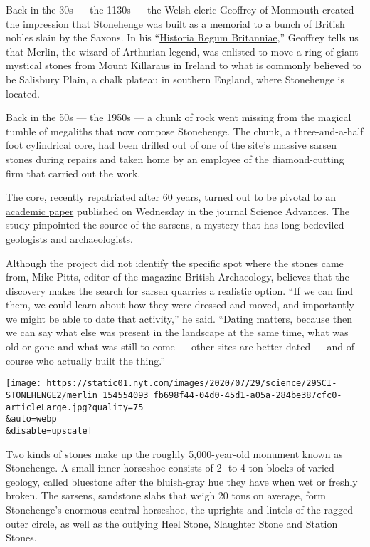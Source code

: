 Back in the 30s --- the 1130s --- the Welsh cleric Geoffrey of Monmouth
created the impression that Stonehenge was built as a memorial to a
bunch of British nobles slain by the Saxons. In his
``\href{https://en.wikipedia.org/wiki/Historia_Regum_Britanniae}{Historia
Regum Britanniae},'' Geoffrey tells us that Merlin, the wizard of
Arthurian legend, was enlisted to move a ring of giant mystical stones
from Mount Killaraus in Ireland to what is commonly believed to be
Salisbury Plain, a chalk plateau in southern England, where Stonehenge
is located.

Back in the 50s --- the 1950s --- a chunk of rock went missing from the
magical tumble of megaliths that now compose Stonehenge. The chunk, a
three-and-a-half foot cylindrical core, had been drilled out of one of
the site's massive sarsen stones during repairs and taken home by an
employee of the diamond-cutting firm that carried out the work.

The core,
\href{https://www.nytimes.com/2019/05/08/world/europe/uk-stonehenge-missing-piece.html}{recently
repatriated} after 60 years, turned out to be pivotal to an
\href{https://advances.sciencemag.org/content/6/31/eabc0133}{academic
paper} published on Wednesday in the journal Science Advances. The study
pinpointed the source of the sarsens, a mystery that has long bedeviled
geologists and archaeologists.

Although the project did not identify the specific spot where the stones
came from, Mike Pitts, editor of the magazine British Archaeology,
believes that the discovery makes the search for sarsen quarries a
realistic option. ``If we can find them, we could learn about how they
were dressed and moved, and importantly we might be able to date that
activity,'' he said. ``Dating matters, because then we can say what else
was present in the landscape at the same time, what was old or gone and
what was still to come --- other sites are better dated --- and of
course who actually built the thing.''

\texttt{[image: https://static01.nyt.com/images/2020/07/29/science/29SCI-STONEHENGE2/merlin\_154554093\_fb698f44-04d0-45d1-a05a-284be387cfc0-articleLarge.jpg?quality=75\\\&auto=webp\\\&disable=upscale]}

Two kinds of stones make up the roughly 5,000-year-old monument known as
Stonehenge. A small inner horseshoe consists of 2- to 4-ton blocks of
varied geology, called bluestone after the bluish-gray hue they have
when wet or freshly broken. The sarsens, sandstone slabs that weigh 20
tons on average, form Stonehenge's enormous central horseshoe, the
uprights and lintels of the ragged outer circle, as well as the outlying
Heel Stone, Slaughter Stone and Station Stones.

